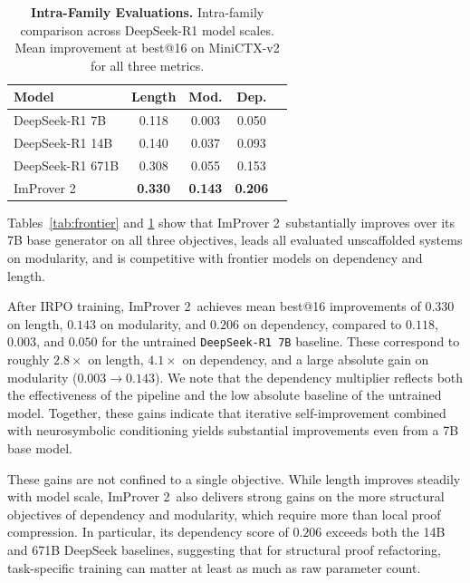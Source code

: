 \begin{table}
\centering
\caption{\textbf{Intra-Family Evaluations.} Intra-family comparison across DeepSeek-R1 model scales. Mean improvement at best@16 on MiniCTX-v2 for all three metrics.}
\small
\begin{tabular}{l|cccc}
\hline
\textbf{Model}  & \textbf{Length} & \textbf{Mod.} & \textbf{Dep.} \\
\hline
DeepSeek-R1 7B     & 0.118 & 0.003 & 0.050  \\ 
DeepSeek-R1 14B      & 0.140 & 0.037 & 0.093  \\
DeepSeek-R1 671B & 0.308 & 0.055 & 0.153  \\
\hdashline
ImProver 2  & \textbf{0.330} & \textbf{0.143} & \textbf{0.206}  \\
\hline
\end{tabular}
\label{tab:intrafamily}
\end{table}



Tables~\ref{tab:frontier} and \ref{tab:intrafamily} show that ImProver 2\ substantially improves over its 7B base generator on all three objectives, leads all evaluated unscaffolded systems on modularity, and is competitive with frontier models on dependency and length.


After IRPO training, ImProver 2\ achieves mean best@16 improvements of $0.330$ on 
length, $0.143$ on modularity, and $0.206$ on dependency, compared to $0.118$, 
$0.003$, and $0.050$ for the untrained \texttt{DeepSeek-R1 7B} baseline.
These correspond to roughly $2.8\times$ on length, $4.1\times$ on dependency, and 
a large absolute gain on modularity ($0.003 \to 0.143$). We note that the 
dependency multiplier reflects both the effectiveness of the pipeline and the 
low absolute baseline of the untrained model. Together, 
these gains indicate that iterative self-improvement combined with neurosymbolic 
conditioning yields substantial improvements even from a 7B base model.

These gains are not confined to a single objective.
While length improves steadily with model scale, ImProver 2\ also delivers strong gains on the more structural objectives of dependency and modularity, which require more than local proof compression.
In particular, its dependency score of $0.206$ exceeds both the 14B and 671B DeepSeek baselines, suggesting that for structural proof refactoring, task-specific training can matter at least as much as raw parameter count.

